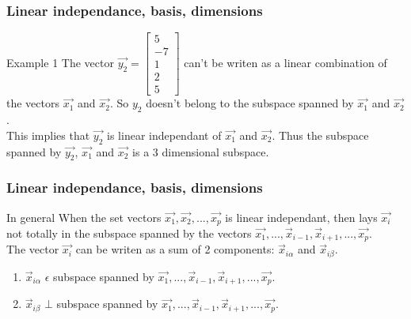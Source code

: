\begin{frame}
	\frametitle{Linear independance, basis, dimensions}
	\begin{block}{Example 1}
		The vector $\overrightarrow{y_2}=\begin{bmatrix} 5\\-7\\1\\2\\5\end{bmatrix}$ can't be writen as a linear combination of the vectors $\overrightarrow{x_1}$ and $\overrightarrow{x_2}$. So $y_2$ doesn't belong to the subspace spanned by $\overrightarrow{x_1}$ and $\overrightarrow{x_2}$.\\
		This implies that $\overrightarrow{y_2}$ is linear independant of $\overrightarrow{x_1}$ and $\overrightarrow{x_2}$. Thus the subspace spanned by $\overrightarrow{y_2}$, $\overrightarrow{x_1}$ and $\overrightarrow{x_2}$ is a 3 dimensional subspace.
	\end{block}
\end{frame}

\begin{frame}
	\frametitle{Linear independance, basis, dimensions}
	\begin{block}{In general}
		When the set vectors $\overrightarrow{x_1},\overrightarrow{x_2},..., \overrightarrow{x_p}$ is linear independant, then lays $\overrightarrow{x_i}$ not totally in the subspace spanned by the vectors $\overrightarrow{x_1},..., \overrightarrow{x}_{i-1}, \overrightarrow{x}_{i+1},...,\overrightarrow{x_p}$.\\
		The vector $\overrightarrow{x_i}$ can be writen as a sum of 2 components: $\overrightarrow{x}_{i\alpha}$ and $\overrightarrow{x}_{i\beta}$.
		\begin{enumerate}
			\item $\overrightarrow{x}_{i\alpha}$ $\epsilon$ subspace spanned by $\overrightarrow{x_1},..., \overrightarrow{x}_{i-1}, \overrightarrow{x}_{i+1},...,\overrightarrow{x_p}$.
			\item $\overrightarrow{x}_{i\beta}$ $\bot$ subspace spanned by $\overrightarrow{x_1},..., \overrightarrow{x}_{i-1}, \overrightarrow{x}_{i+1},...,\overrightarrow{x_p}$.
		\end{enumerate}
	\end{block}
\end{frame}

